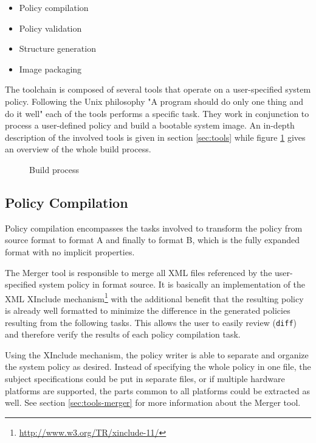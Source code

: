 \documentclass[a4paper,twoside,titlepage]{article}
\begin{document}
\begin{itemize}
	\item Policy compilation
	\item Policy validation
	\item Structure generation
	\item Image packaging
\end{itemize}

The toolchain is composed of several tools that operate on a user-specified
system policy. Following the Unix philosophy "A program should do only one thing
and do it well" each of the tools performs a specific task. They work in
conjunction to process a user-defined policy and build a bootable system image.
An in-depth description of the involved tools is given in section
\ref{sec:tools} while figure \ref{fig:build-process} gives an overview of the
whole build process.

\begin{figure}[h]
	\centering
	
	\caption{Build process}
	\label{fig:build-process}
\end{figure}

\subsection{Policy Compilation}
\label{sec:build-policy_compilation}
Policy compilation encompasses the tasks involved to transform the policy from
source format to format A and finally to format B, which is the fully expanded
format with no implicit properties.

The Merger tool is responsible to merge all XML files referenced by the
user-specified system policy in format source. It is basically an implementation
of the XML XInclude mechanism\footnote{\url{http://www.w3.org/TR/xinclude-11/}}
with the additional benefit that the resulting policy is already well formatted
to minimize the difference in the generated policies resulting from the
following tasks.  This allows the user to easily review (\texttt{diff}) and
therefore verify the results of each policy compilation task.

Using the XInclude mechanism, the policy writer is able to separate and organize
the system policy as desired. Instead of specifying the whole policy in one
file, the subject specifications could be put in separate files, or if multiple
hardware platforms are supported, the parts common to all platforms could be
extracted as well. See section \ref{sec:tools-merger} for more information about
the Merger tool.
\end{document}

